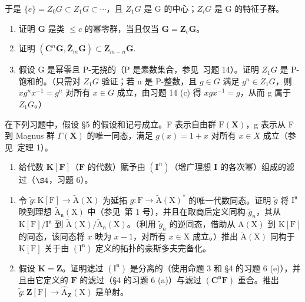 于是 \(\{e\} = Z_0G \subset Z_1G \subset \cdots\)，且 \(Z_1G\) 是 G 的中心；\(Z_iG\) 是 G 的特征子群。

\begin{enumerate}
\def\labelenumi{(\alph{enumi})}
\item
  证明 \(\mathbf{G}\) 是类 \(\leqslant c\) 的幂零群，当且仅当 \(\mathbf{G} = \mathbf{Z}_c\mathbf{G}\)。
\item
  证明 \((\mathbf{C}^n\mathbf{G},\bar{\mathbf{Z}}_m\mathbf{G})\subset \mathbf{Z}_{m - n}\mathbf{G}.\)
\item
  假设 G 是幂零且 P-无挠的（P 是素数集合，参见~习题 14）。证明 \(Z_{1}G\) 是 P-饱和的。（只需对 \(Z_{1}G\) 验证；若 n 是 P-整数，且 \(g \in G\) 满足 \(g^{n} \in Z_{1}G\)，则 \(xg^{n}x^{-1} = g^{n}\) 对所有 \(x \in G\) 成立，由习题 14 (c) 得 \(xgx^{-1} = g\)，从而 g 属于 \(Z_{1}G\)。）
\end{enumerate}


在下列习题中，假设 §5 的假设和记号成立。F 表示自由群 \(\mathrm{F}(\mathbf{X})\)，g 表示从 F 到 Magnus 群 \(\Gamma(\mathbf{X})\) 的唯一同态，满足 \(g(x)=1+x\) 对所有 \(x\in X\) 成立（参见~定理 1）。

\begin{enumerate}
\def\labelenumi{\arabic{enumi}.}
\tightlist
\item
  给代数 \(\mathbf{K}[\mathbf{F}]\)（\(\mathbf{F}\) 的代数）赋予由 \((\mathbf{I}^n)\)（增广理想 \(\mathbf{I}\) 的各次幂）组成的滤过（\(\S 4\)，习题 6）。
\end{enumerate}

\begin{enumerate}
\def\labelenumi{(\alph{enumi})}
\item
  令 \(\tilde{g}\colon \mathrm{K}[\mathrm{F}] \to \tilde{\mathrm{A}}(\mathrm{X})\) 为延拓 \(g\colon \mathrm{F} \to \tilde{\mathrm{A}}(\mathrm{X})^*\) 的唯一代数同态。证明 \(\tilde{g}\) 将 \(\mathrm{I}^{\mathfrak{n}}\) 映到理想 \(\tilde{\mathrm{A}}_{\mathfrak{n}}(\mathrm{X})\) 中（参见~第 1 号），并且在取商后定义同构 \(\tilde{g}_{n}\)，其从 \(\mathrm{K}[\mathrm{F}]/\mathrm{I}^{\mathfrak{n}}\) 到 \(\tilde{\mathrm{A}}(\mathrm{X})/\tilde{\mathrm{A}}_{\mathfrak{n}}(\mathrm{X})\)。（利用 \(\tilde{g}_{n}\) 的逆同态，借助从 \(\mathrm{A}(\mathrm{X})\) 到 \(\mathrm{K}[\mathrm{F}]\) 的同态，该同态将 \(x\) 映为 \(x - 1\)，对所有 \(x \in \mathrm{X}\) 成立。）推出 \(\tilde{\mathrm{A}}(\mathrm{X})\) 同构于 \(\mathrm{K}[\mathrm{F}]\) 关于由 \((\mathrm{I}^{\mathfrak{n}})\) 定义的拓扑的豪斯多夫完备化。
\item
  假设 \(\mathbf{K} = \mathbf{Z}\)。证明滤过 \((\mathrm{I}^{\mathrm{n}})\) 是分离的（使用命题 3 和 §4 的习题 6 (e)），并且由它定义的 \(\mathbf{F}\) 的滤过（§4 的习题 6 (a)）与滤过 \((\mathbf{C}^{\mathrm{n}}\mathbf{F})\) 重合。推出 \(\tilde{g}\colon \mathbf{Z}[\mathrm{F}] \to \hat{\mathrm{A}}_{\mathbf{Z}}(\mathrm{X})\) 是单射。
\end{enumerate}

